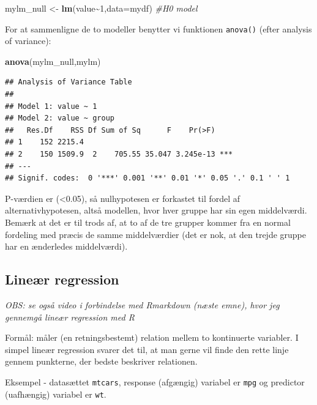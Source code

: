 \documentclass[
]{book}
\newenvironment{Shaded}{\begin{snugshade}}{\end{snugshade}}
\newcommand{\AttributeTok}[1]{\textcolor[rgb]{0.13,0.29,0.53}{#1}}
\newcommand{\CommentTok}[1]{\textcolor[rgb]{0.56,0.35,0.01}{\textit{#1}}}
\newcommand{\DecValTok}[1]{\textcolor[rgb]{0.00,0.00,0.81}{#1}}
\newcommand{\FunctionTok}[1]{\textcolor[rgb]{0.13,0.29,0.53}{\textbf{#1}}}
\newcommand{\NormalTok}[1]{#1}
\newcommand{\OtherTok}[1]{\textcolor[rgb]{0.56,0.35,0.01}{#1}}
\newcommand{\SpecialCharTok}[1]{\textcolor[rgb]{0.81,0.36,0.00}{\textbf{#1}}}
\theoremstyle{definition}
\theoremstyle{definition}
\theoremstyle{definition}
\theoremstyle{definition}
\theoremstyle{remark}
\begin{document}
\begin{Shaded}
\begin{Highlighting}[]
\NormalTok{mylm\_null }\OtherTok{\textless{}{-}} \FunctionTok{lm}\NormalTok{(value}\SpecialCharTok{\textasciitilde{}}\DecValTok{1}\NormalTok{,}\AttributeTok{data=}\NormalTok{mydf) }\CommentTok{\#H0 model}
\end{Highlighting}
\end{Shaded}

For at sammenligne de to modeller benytter vi funktionen \texttt{anova()} (efter analysis of variance):

\begin{Shaded}
\begin{Highlighting}[]
\FunctionTok{anova}\NormalTok{(mylm\_null,mylm)}
\end{Highlighting}
\end{Shaded}

\begin{verbatim}
## Analysis of Variance Table
## 
## Model 1: value ~ 1
## Model 2: value ~ group
##   Res.Df    RSS Df Sum of Sq      F    Pr(>F)    
## 1    152 2215.4                                  
## 2    150 1509.9  2    705.55 35.047 3.245e-13 ***
## ---
## Signif. codes:  0 '***' 0.001 '**' 0.01 '*' 0.05 '.' 0.1 ' ' 1
\end{verbatim}

P-værdien er (\textless0.05), så nulhypotesen er forkastet til fordel af alternativhypotesen, altså modellen, hvor hver gruppe har sin egen middelværdi. Bemærk at det er til trods af, at to af de tre grupper kommer fra en normal fordeling med præcis de samme middelværdier (det er nok, at den trejde gruppe har en ænderledes middelværdi).

\subsection{Lineær regression}\label{lineuxe6r-regression}

\emph{OBS: se også video i forbindelse med Rmarkdown (næste emne), hvor jeg gennemgå lineær regression med R}

Formål: måler (en retningsbestemt) relation mellem to kontinuerte variabler. I simpel lineær regression svarer det til, at man gerne vil finde den rette linje gennem punkterne, der bedste beskriver relationen.

Eksempel - datasættet \texttt{mtcars}, response (afgængig) variabel er \texttt{mpg} og predictor (uafhængig) variabel er \texttt{wt}.
\end{document}
